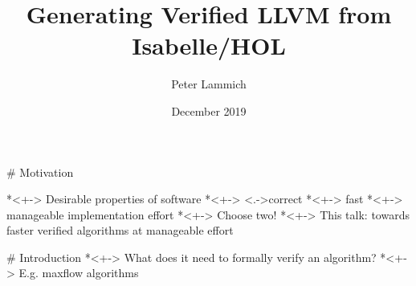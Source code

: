 \documentclass[fleqn]{beamer}
\title{Generating Verified LLVM from Isabelle/HOL}
\author[Peter Lammich]{Peter Lammich}
\institute[UoM] %
{ The University of Manchester}
\date {December 2019}
\begin{document}
% 

\begin{frame}
  \titlepage
\end{frame}


\newcommand{\insertsectitle}{}

\setbeamertemplate{frametitle}{\vspace{.7em}\insertframetitle\hfill \small\raisebox{10pt}{\insertsectitle}}

# Motivation

  *<+-> Desirable properties of software
    *<+-> \onslide<.->{correct}
    *<+-> fast
    *<+-> manageable implementation effort
  *<+-> Choose two!
  *<+-> This talk: towards faster verified algorithms at manageable effort

\def\algoAugment{
  \begin{algorithmic}
    \Procedure{augment}{$g,f,p$}
      \State{$c_p \gets \min\{ g_f(u,v) \mid (u,v)\in p \}$}
      \ForAll{$(u,v)\in p$}
        \If{$(u,v)\in g$}~$f(u,v)\gets f(u,v) + c_p$
        \Else~$f(v,u)\gets f(v,u) - c_p$
        \EndIf
      \EndFor
      \Return{$f$}
    \EndProcedure
  \end{algorithmic}
}

\def\algoEdka{
  \begin{algorithmic}
    \Procedure{Edmonds-Karp}{$g,s,t$}
      \State{$f\gets \lambda(u,v).~0$}
      \While{exists augmenting path in $g_f$}
        \State{$p \gets {}$ shortest augmenting path}
        \State{$f \gets $\Call{augment}{$g,f,p$}}
      \EndWhile
    \EndProcedure
  \end{algorithmic}
}

# Introduction
  *<+-> What does it need to formally verify an algorithm?
    *<+-> E.g. maxflow algorithms
\end{document}
